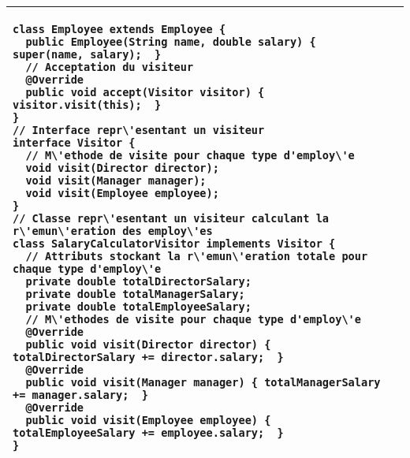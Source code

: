 \begin{table}[H]
\begin{adjustbox}{max width=\textwidth}
\begin{tabular}{l|p{\textwidth}}
\begin{minipage}[tr]{0.5\textwidth}
\begin{lstlisting}[style=monstyle]
class Employee extends Employee {
  public Employee(String name, double salary) { super(name, salary);  }
  // Acceptation du visiteur
  @Override
  public void accept(Visitor visitor) {  visitor.visit(this);  }
}
// Interface repr\'esentant un visiteur
interface Visitor {
  // M\'ethode de visite pour chaque type d'employ\'e
  void visit(Director director);
  void visit(Manager manager);
  void visit(Employee employee);
}
// Classe repr\'esentant un visiteur calculant la r\'emun\'eration des employ\'es
class SalaryCalculatorVisitor implements Visitor {
  // Attributs stockant la r\'emun\'eration totale pour chaque type d'employ\'e
  private double totalDirectorSalary;
  private double totalManagerSalary;
  private double totalEmployeeSalary;
  // M\'ethodes de visite pour chaque type d'employ\'e
  @Override
  public void visit(Director director) { totalDirectorSalary += director.salary;  }
  @Override
  public void visit(Manager manager) { totalManagerSalary += manager.salary;  }
  @Override
  public void visit(Employee employee) { totalEmployeeSalary += employee.salary;  }
}
\end{lstlisting}
\end{minipage}
\\
\bottomrule
\end{tabular}
\end{adjustbox}
\end{table}
